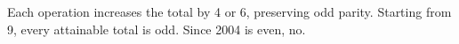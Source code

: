 Each operation increases the total by 4 or 6, preserving odd parity. Starting from 9, every attainable total is odd. Since 2004 is even, $\boxed{\text{no}}$.
